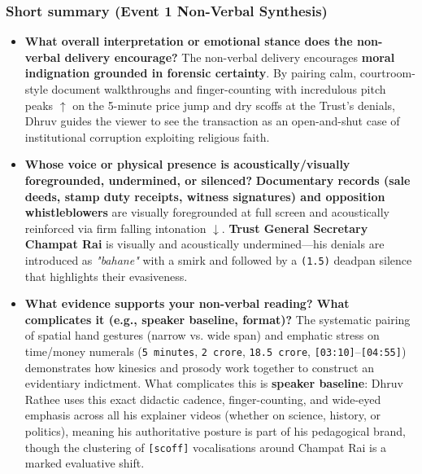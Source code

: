\documentclass[10pt,a4paper]{article}
\begin{document}
\subsubsection*{Short summary (Event 1 Non-Verbal Synthesis)}

\begin{itemize}
  \item \textbf{What overall interpretation or emotional stance does the non-verbal delivery encourage?}
The non-verbal delivery encourages \textbf{moral indignation grounded in forensic certainty}. By pairing calm, courtroom-style document walkthroughs and finger-counting with incredulous pitch peaks \texttt{$\uparrow$} on the 5-minute price jump and dry scoffs at the Trust's denials, Dhruv guides the viewer to see the transaction as an open-and-shut case of institutional corruption exploiting religious faith.\par\smallskip
  \item \textbf{Whose voice or physical presence is acoustically/visually foregrounded, undermined, or silenced?}
\textbf{Documentary records (sale deeds, stamp duty receipts, witness signatures) and opposition whistleblowers} are visually foregrounded at full screen and acoustically reinforced via firm falling intonation \texttt{$\downarrow$}. \textbf{Trust General Secretary Champat Rai} is visually and acoustically undermined---his denials are introduced as \textit{"bahane"} with a smirk and followed by a \texttt{(1.5)} deadpan silence that highlights their evasiveness.\par\smallskip
  \item \textbf{What evidence supports your non-verbal reading? What complicates it (e.g., speaker baseline, format)?}
The systematic pairing of spatial hand gestures (narrow vs. wide span) and emphatic stress on time/money numerals (\texttt{5 minutes}, \texttt{2 crore}, \texttt{18.5 crore}, \texttt{[03:10]}--\texttt{[04:55]}) demonstrates how kinesics and prosody work together to construct an evidentiary indictment. What complicates this is \textbf{speaker baseline}: Dhruv Rathee uses this exact didactic cadence, finger-counting, and wide-eyed emphasis across all his explainer videos (whether on science, history, or politics), meaning his authoritative posture is part of his pedagogical brand, though the clustering of \texttt{[scoff]} vocalisations around Champat Rai is a marked evaluative shift.\par\smallskip
\end{itemize}
\end{document}
